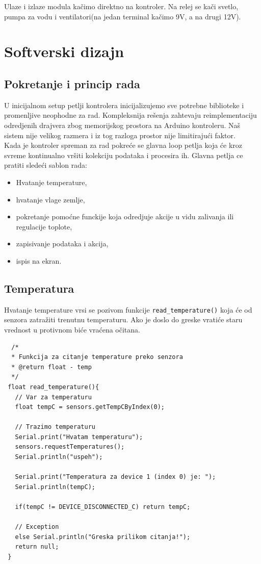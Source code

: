 \documentclass[a4paper,11pt]{book}
\begin{document}
Ulaze i izlaze modula kačimo direktno na kontroler. Na relej se kači svetlo, pumpa za vodu i ventilatori(na jedan terminal kačimo 9V, a na drugi 12V).

\section{Softverski dizajn}

\subsection{Pokretanje i princip rada}

U inicijalnom setup petlji kontrolera inicijalizujemo sve potrebne biblioteke i promenljive neophodne za rad. Kompleksnija rešenja zahtevaju reimplementaciju odredjenih drajvera zbog memorijskog prostora na Arduino kontroleru. Naš sistem nije velikog razmera i iz tog razloga prostor nije limitirajući faktor.\\

Kada je kontroler spreman za rad pokreće se glavna loop petlja koja će kroz svreme kontinualno vršiti kolekciju podataka i procesira ih. Glavna petlja ce pratiti sledeći sablon rada:

\hrulefill
\begin{itemize}
  \item Hvatanje temperature,
  \item hvatanje vlage zemlje,
  \item pokretanje pomoćne funckije koja odredjuje akcije u vidu zalivanja ili regulacije toplote,
  \item zapisivanje podataka i akcija,
  \item ispis na ekran.
\end{itemize}
\hrulefill

\subsection{Temperatura}

Hvatanje temperature vrsi se pozivom funkcije \verb|read_temperature()| koja će od senzora zatražiti trenutnu temperaturu. Ako je doslo do greske vratiće staru vrednost u protivnom biće vraćena očitana. 

\begin{lstlisting}
  /*
  * Funkcija za citanje temperature preko senzora
  * @return float - temp
  */
 float read_temperature(){
   // Var za temperaturu
   float tempC = sensors.getTempCByIndex(0);
   
   // Trazimo temperaturu
   Serial.print("Hvatam temperaturu");
   sensors.requestTemperatures();
   Serial.println("uspeh");
 
   Serial.print("Temperatura za device 1 (index 0) je: ");
   Serial.println(tempC);
 
   if(tempC != DEVICE_DISCONNECTED_C) return tempC;
 
   // Exception
   else Serial.println("Greska prilikom citanja!");
   return null;
 }
\end{lstlisting}
  
\end{document}
